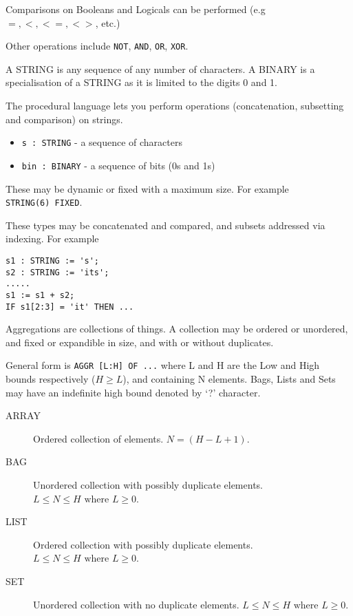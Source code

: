 Comparisons on Booleans and Logicals can be performed (e.g $=, <, <=, <>$, etc.)

Other operations include \verb|NOT|, \verb|AND|, \verb|OR|, \verb|XOR|.


\begin{remarks}
\remintro
{}

A STRING is any sequence of any number of characters. A BINARY
is a specialisation of a STRING as it is limited to the digits 0 and 1.

The procedural language lets you perform operations (concatenation,
subsetting and comparison) on strings.

\remend
\end{remarks}
 


\begin{itemize}
\item \verb|s : STRING| - a sequence of characters
\item\verb|bin : BINARY| - a sequence of bits (0s and 1s)
\end{itemize}
These may be dynamic or fixed with a maximum size. For example \\
  \verb|STRING(6) FIXED|.

These types may be concatenated and compared, and subsets addressed via 
indexing. For example
\begin{verbatim}
s1 : STRING := 's';
s2 : STRING := 'its';
.....
s1 := s1 + s2;
IF s1[2:3] = 'it' THEN ...
\end{verbatim}


\begin{remarks}
\remintro
{}

Aggregations are collections of things. A collection may be ordered or 
unordered, and fixed or expandible in size, and with or without duplicates.

\remend
\end{remarks}



    General form is \verb?AGGR [L:H] OF ...? where L and H are the Low and High
bounds respectively ($H \geq L$), and containing N elements. Bags, Lists and 
Sets may have
an indefinite high bound denoted by `?' character.

\begin{description}
\item[ARRAY] Ordered collection of elements.
           $N = (H-L+1)$.
\item[BAG] Unordered collection with possibly duplicate elements.
           $L \leq N \leq H \mbox{ where } L \geq 0$.
\item[LIST] Ordered collection with possibly duplicate elements.
           $L \leq N \leq H \mbox{ where } L \geq 0$.
\item[SET] Unordered collection with no duplicate elements.
           $L \leq N \leq H \mbox{ where } L \geq 0$.
\end{description}

